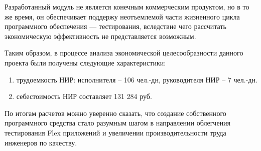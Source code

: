Разработанный модуль не является конечным коммерческим продуктом, но в то же время, он обеспечивает
поддержу неотъемлемой части жизненного цикла программного обеспечения --- тестирования, вследствие чего
рассчитать экономическую эффективность не представляется возможным.

Таким образом, в процессе анализа экономической целесообразности данного проекта были получены следующие
характеристики:

\begin{enumerate}
\item трудоемкость НИР: исполнителя – 106 чел.-дн, руководителя НИР – 7 чел.-дн.
\item себестоимость НИР составляет 131 284 руб.
\end{enumerate}

По итогам расчетов можно уверенно сказать, что создание собственного программного средства стало
разумным шагом в направлении облегчения тестирования Flex приложений и увеличении производительности
труда инженеров по качеству.